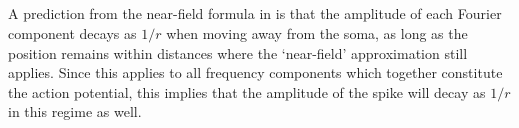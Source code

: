 





\subsection{}



A prediction from the near-field formula in  is that the amplitude of each Fourier component decays as $1/r$ when moving away from the soma, 
as long as the position remains within distances where the `near-field' approximation still applies.
Since this applies to all frequency components which together constitute the action potential, this implies that the amplitude of the 
spike will decay as $1/r$ in this regime as well. 

